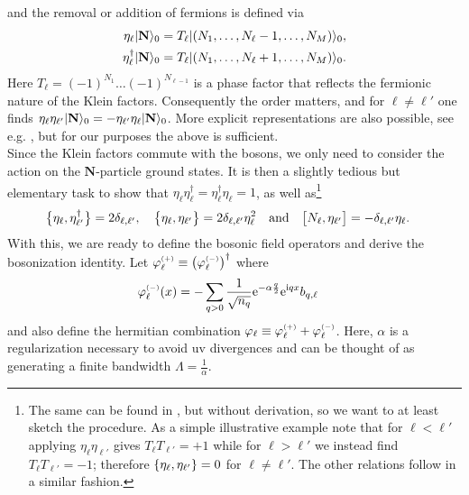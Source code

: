 and the removal or addition of fermions is defined via
\begin{align*}
\eta_\ell \Ket{\textbf{N}}_0 &= T_\ell \Ket{(N_1, \dots, N_\ell - 1, \dots, N_M)}_0,\\
\eta_\ell^\dagger \Ket{\textbf{N}}_0 &= T_\ell \Ket{(N_1, \dots, N_\ell + 1, \dots, N_M)}_0.
\end{align*}
Here $T_\ell = (-1)^{N_1} \dots (-1)^{N_{\ell-1}}$ is a phase factor that reflects the fermionic nature of the Klein factors.
Consequently the order matters, and for $\ell\neq \ell'$ one finds $\eta_\ell \eta_{\ell'} \Ket{\textbf{N}}_0 = - \eta_{\ell'} \eta_\ell \Ket{\textbf{N}}_0$.
More explicit representations are also possible, see  e.g. \cites[\sapp B]{Bosonization_TLL_Schonhammer_1997}{Bosonization_DelftSchoeller_1998}, but for our purposes the above is sufficient.\\
Since the Klein factors commute with the bosons, we only need to consider the action on the $\textbf{N}$-particle ground states.
It is then a slightly tedious but elementary task to show that $\eta_\ell\eta_\ell^\dagger = \eta_\ell^\dagger\eta_\ell = 1$, as well as\footnote{The same can be found in \cite{Bosonization_DelftSchoeller_1998}, but without derivation, so we want to at least sketch the procedure.
As a simple illustrative example note that for $\ell < \ell'$ applying $\eta_\ell \eta_{\ell'}$ gives $T_\ell T_{\ell'} = +1$ while for $\ell > \ell'$ we instead find $T_\ell T_{\ell'} = -1$; therefore $\klc*{\eta_\ell, \eta_{\ell'}} = 0$ for $\ell\neq \ell'$. 
The other relations follow in a similar fashion.}
\begin{align*}
\klc[\big]{\eta_\ell, \eta_{\ell'}^\dagger} &= 2\delta_{\ell,\ell'}, \quad \klc[\big]{\eta_\ell, \eta_{\ell'}} = 2\delta_{\ell,\ell'} \eta_\ell^2 \quad \text{and} \quad \klb[\big]{N_\ell, \eta_{\ell'}} = -\delta_{\ell,\ell'} \eta_\ell .
\end{align*}
With this, we are ready to define the bosonic field operators and derive the bosonization identity.
Let $\varphi_\ell\eplus \equiv \kla[\big]{\varphi_\ell\eminus}^\dagger$ where
\begin{align}
\varphi_\ell\eminus(x) &= -\sum_{q>0} \frac{1}{\sqrt{n_q}} \powe{-\alpha \frac{q}{2}} \powe{\i qx} b_{q,\ell} \label{eqn:bos:varphi_ell_minus_def}
\end{align}
and also define the hermitian combination $\varphi_\ell\equiv \varphi_\ell\eplus + \varphi_\ell\eminus$.
Here, $\alpha$ is a regularization necessary to avoid \gls{uv} divergences and can be thought of as generating a finite bandwidth $\Lambda= \frac{1}{\alpha}$.
